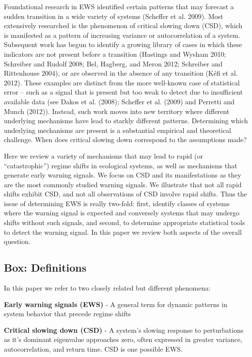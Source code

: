 \documentclass[author-year, review]{elsarticle} %
\begin{document}
Foundational research in EWS identified certain patterns that may
forecast a sudden transition in a wide variety of systems (Scheffer et
al. 2009). Most extensively researched is the phenomenon of critical
slowing down (CSD), which is manifested as a pattern of increasing
variance or autocorrelation of a system. Subsequent work has begun to
identify a growing library of cases in which these indicators are not
present before a transition (Hastings and Wysham 2010; Schreiber and
Rudolf 2008; Bel, Hagberg, and Meron 2012; Schreiber and Rittenhouse
2004), or are observed in the absence of any transition (Kéfi et al.
2012). These examples are distinct from the more well-known case of
statistical error -- such as a signal that is present but too weak to
detect due to insufficient available data (see Dakos et al. (2008);
Scheffer et al. (2009) and Perretti and Munch (2012)). Instead, such
work moves into new territory where different underlying mechanisms have
lead to starkly different patterns. Determining which underlying
mechanisms are present is a substantial empirical and theoretical
challenge. When does critical slowing down correspond to the assumptions
made?

Here we review a variety of mechanisms that may lead to rapid (or
``catastrophic'') regime shifts in ecological systems, as well as
mechanisms that generate early warning signals. We focus on CSD and its
manifestations as they are the most commonly studied warning signals. We
illustrate that not all rapid shifts exhibit CSD, and not all
observations of CSD involve rapid shifts. Thus the issue of determining
EWS is really two-fold: first, identify classes of systems where the
warning signal is expected and conversely systems that may undergo
shifts without such signals, and second, to determine appropriate
statistical tools to detect the warning signal. In this paper we review
both aspects of the overall question.

\subsection{Box: Definitions}

In this paper we refer to two closely related but different phenomena:

\textbf{Early warning signals (EWS)} - A general term for dynamic
patterns in system behavior that precede regime shifts

\textbf{Critical slowing down (CSD)} - A system's slowing response to
perturbations as it's dominant eigenvalue approaches zero, often
expressed in greater variance, autocorrelation, and return time. CSD is
one possible EWS.
\end{document}
